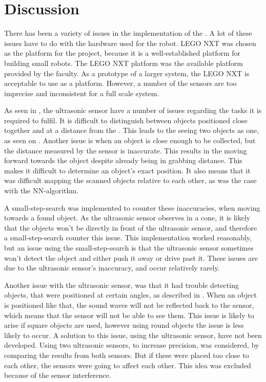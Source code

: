 \section{Discussion} \label{sec:discussion}

There has been a variety of issues in the implementation of the \projname{}. A lot of these issues have to do with the hardware used for the robot. LEGO NXT was chosen as the platform for the project, because it is a well-established platform for building small robots. The LEGO NXT platform was the available platform provided by the faculty. As a prototype of a larger system, the LEGO NXT is acceptable to use as a platform. However, a number of the sensors are too imprecise and inconsistent for a full scale system.

As seen in , the ultrasonic sensor have a number of issues regarding the tasks it is required to fulfil. It is difficult to distinguish between objects positioned close together and at a distance from the \projname{}. This leads to the \projname{} seeing two objects as one, as seen on . Another issue is when an object is close enough to be collected, but the distance measured by the sensor is inaccurate. This results in the \projname{} moving forward towards the object despite already being in grabbing distance. This makes it difficult to determine an object's exact position. It also means that it was difficult mapping the scanned objects relative to each other, as was the case with the NN-algorithm.

A small-step-search was implemented to counter these inaccuracies, when moving towards a found object. As the ultrasonic sensor observes in a cone, it is likely that the objects won't be directly in front of the ultrasonic sensor, and therefore a small-step-search counter this issue. This implementation worked reasonably, but an issue using the small-step-search is that the ultrasonic sensor sometimes won't detect the object and either push it away or drive past it. These issues are due to the ultrasonic sensor's inaccuracy, and occur relatively rarely.

Another issue with the ultrasonic sensor, was that it had trouble detecting objects, that were positioned at certain angles, as described in . When an object is positioned like that, the sound waves will not be reflected back to the sensor, which means that the sensor will not be able to see them. This issue is likely to arise if square objects are used, however using round objects the issue is less likely to occur. A solution to this issue, using the ultrasonic sensor, have not been developed. Using two ultrasonic sensors, to increase precision, was considered, by comparing the results from both sensors. But if these were placed too close to each other, the sensors were going to affect each other. This idea was excluded because of the sensor interference.

